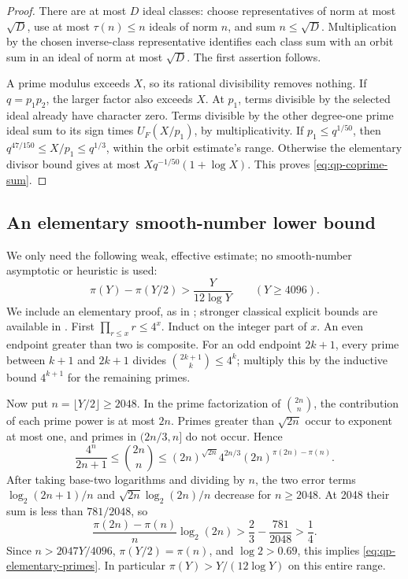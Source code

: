 \begin{proof}
There are at most $D$ ideal classes: choose representatives of norm at
most $\sqrt D$, use at most $\tau(n)\leq n$ ideals of norm $n$, and
sum $n\leq\sqrt D$.  Multiplication by the chosen inverse-class
representative identifies each class sum with an orbit sum in an ideal
of norm at most $\sqrt D$.  The first assertion follows.

A prime modulus exceeds $X$, so its rational divisibility removes
nothing.  If $q=p_1p_2$, the larger factor also exceeds $X$.
At $p_1$, terms divisible by the selected ideal already have character
zero.  Terms divisible by the other degree-one prime ideal sum to its
sign times $U_F(X/p_1)$, by multiplicativity.  If
$p_1\leq q^{1/50}$, then
$q^{47/150}\leq X/p_1\leq q^{1/3}$, within the orbit estimate's
range.  Otherwise the elementary divisor bound gives at most
$Xq^{-1/50}(1+\log X)$.  This proves \eqref{eq:qp-coprime-sum}.
\end{proof}

\subsection{An elementary smooth-number lower bound}
\label{subsec:qp-smooth}

We only need the following weak, effective estimate; no smooth-number
asymptotic or heuristic is used:
\begin{equation}
 \pi(Y)-\pi(Y/2)>\frac{Y}{12\log Y}\qquad(Y\geq4096).
 \label{eq:qp-elementary-primes}
\end{equation}
We include an elementary proof, as in \cite{CogDet2026}; stronger
classical explicit bounds are available in \cite{RosserSchoenfeld1962}.
First $\prod_{r\leq x}r\leq4^x$.  Induct on the integer part of $x$.
An even endpoint greater than two is composite.  For an odd endpoint
$2k+1$, every prime between $k+1$ and $2k+1$ divides
$\binom{2k+1}{k}\leq4^k$; multiply this by the inductive bound
$4^{k+1}$ for the remaining primes.

Now put $n=\lfloor Y/2\rfloor\geq2048$.  In the prime factorization
of $\binom{2n}{n}$, the contribution of each prime power is at most
$2n$.  Primes greater than $\sqrt{2n}$ occur to exponent at most one,
and primes in $(2n/3,n]$ do not occur.  Hence
\[
 \frac{4^n}{2n+1}\leq\binom{2n}{n}
 \leq (2n)^{\sqrt{2n}}4^{2n/3}
                    (2n)^{\pi(2n)-\pi(n)}.
\]
After taking base-two logarithms and dividing by $n$, the two error
terms $\log_2(2n+1)/n$ and
$\sqrt{2n}\log_2(2n)/n$ decrease for $n\geq2048$.
At 2048 their sum is less than $781/2048$, so
\[
 \frac{\pi(2n)-\pi(n)}n\log_2(2n)
 >\frac23-\frac{781}{2048}>\frac14.
\]
Since $n>2047Y/4096$, $\pi(Y/2)=\pi(n)$, and $\log2>0.69$,
this implies \eqref{eq:qp-elementary-primes}.
In particular $\pi(Y)>Y/(12\log Y)$ on this entire range.

